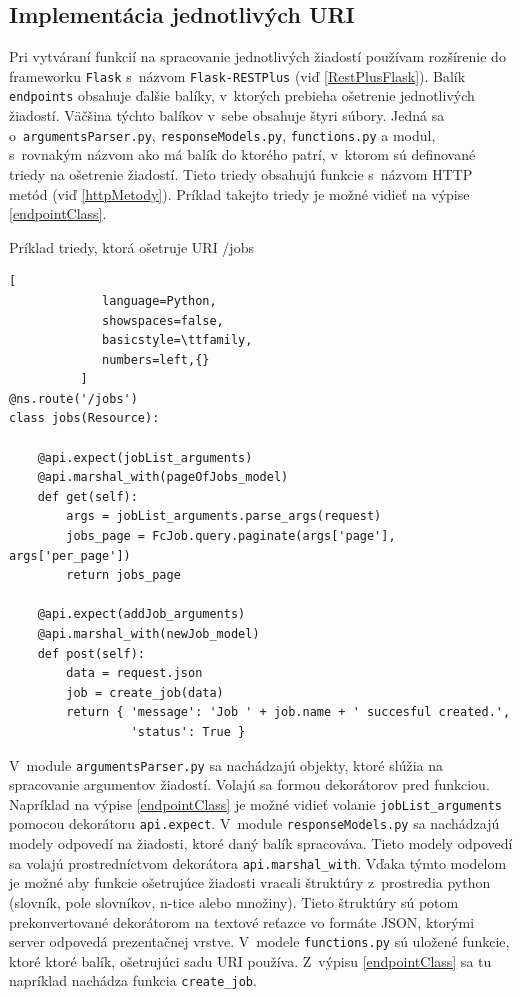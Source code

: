 \documentclass[slovak]{fitthesis}
\begin{document}
\subsection{Implementácia jednotlivých URI}
Pri vytváraní funkcií na spracovanie jednotlivých žiadostí používam rozšírenie do frameworku \texttt{Flask} s~názvom \texttt{Flask-RESTPlus} (viď \ref{RestPlusFlask}). Balík \texttt{endpoints} obsahuje ďalšie balíky, v~ktorých prebieha ošetrenie jednotlivých žiadostí. Väčšina týchto balíkov v~sebe obsahuje štyri súbory. Jedná sa o~\texttt{argumentsParser.py}, \texttt{responseModels.py}, \texttt{functions.py} a modul, s~rovnakým názvom ako má balík do ktorého patrí, v~ktorom sú definované triedy na ošetrenie žiadostí. Tieto triedy obsahujú funkcie s~názvom HTTP metód (viď \ref{httpMetody}). Príklad takejto triedy je možné vidieť na výpise \ref{endpointClass}.
\begin{algorithm}
  \caption{Príklad triedy, ktorá ošetruje URI /jobs}
  \label{endpointClass}
  \begin{lstlisting}[
             language=Python,
             showspaces=false,
             basicstyle=\ttfamily,
             numbers=left,{}
          ]
@ns.route('/jobs')
class jobs(Resource):

    @api.expect(jobList_arguments)
    @api.marshal_with(pageOfJobs_model)
    def get(self):
        args = jobList_arguments.parse_args(request)
        jobs_page = FcJob.query.paginate(args['page'], args['per_page'])
        return jobs_page

    @api.expect(addJob_arguments)
    @api.marshal_with(newJob_model)
    def post(self):
        data = request.json
        job = create_job(data)
        return { 'message': 'Job ' + job.name + ' succesful created.',
                 'status': True }
  \end{lstlisting}
\end{algorithm}
V~module \texttt{argumentsParser.py} sa nachádzajú objekty, ktoré slúžia na spracovanie argumentov žiadostí. Volajú sa formou dekorátorov pred funkciou. Napríklad na výpise \ref{endpointClass} je možné vidieť volanie \texttt{jobList\_arguments} pomocou dekorátoru \texttt{api.expect}. V~module \texttt{responseModels.py} sa nachádzajú modely odpovedí na žiadosti, ktoré daný balík spracováva. Tieto modely odpovedí sa volajú prostredníctvom dekorátora \texttt{api.marshal\_with}. Vďaka týmto modelom je možné aby funkcie ošetrujúce žiadosti vracali štruktúry z~prostredia python (slovník, pole slovníkov, n-tice alebo množiny). Tieto štruktúry sú potom prekonvertované dekorátorom na textové reťazce vo formáte JSON, ktorými server odpovedá prezentačnej vrstve. V~modele \texttt{functions.py} sú uložené funkcie, ktoré ktoré balík, ošetrujúci sadu URI používa. Z~výpisu \ref{endpointClass} sa tu napríklad nachádza funkcia \texttt{create\_job}.
\end{document}
